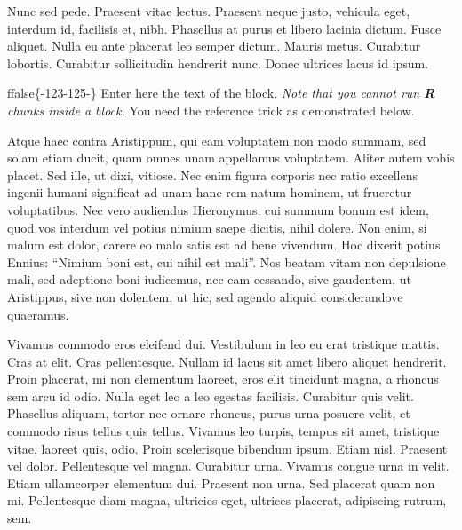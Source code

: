 \documentclass[twoside]{extreport}
\begin{document}
Nunc sed pede. Praesent vitae lectus. Praesent neque justo, vehicula
eget, interdum id, facilisis et, nibh. Phasellus at purus et libero
lacinia dictum. Fusce aliquet. Nulla eu ante placerat leo semper dictum.
Mauris metus. Curabitur lobortis. Curabitur sollicitudin hendrerit nunc.
Donec ultrices lacus id ipsum.














\begin{exampleblock}{}
ffalse\{-123-125-\}\fi{} Enter here the text of the block. \emph{Note
that you cannot run \textbf{R} chunks inside a block.} You need the
reference trick as demonstrated below.

Atque haec contra Aristippum, qui eam voluptatem non
modo summam, sed solam etiam ducit, quam omnes unam appellamus
voluptatem. Aliter autem vobis placet. Sed ille, ut dixi, vitiose. Nec
enim figura corporis nec ratio excellens ingenii humani significat ad
unam hanc rem natum hominem, ut frueretur voluptatibus. Nec vero
audiendus Hieronymus, cui summum bonum est idem, quod vos interdum vel
potius nimium saepe dicitis, nihil dolere. Non enim, si malum est dolor,
carere eo malo satis est ad bene vivendum. Hoc dixerit potius Ennius:
``Nimium boni est, cui nihil est mali''. Nos beatam vitam non depulsione
mali, sed adeptione boni iudicemus, nec eam cessando, sive gaudentem, ut
Aristippus, sive non dolentem, ut hic, sed agendo aliquid considerandove
quaeramus.
\end{exampleblock}

Vivamus commodo eros eleifend dui. Vestibulum in leo eu erat tristique
mattis. Cras at elit. Cras pellentesque. Nullam id lacus sit amet libero
aliquet hendrerit. Proin placerat, mi non elementum laoreet, eros elit
tincidunt magna, a rhoncus sem arcu id odio. Nulla eget leo a leo
egestas facilisis. Curabitur quis velit. Phasellus aliquam, tortor nec
ornare rhoncus, purus urna posuere velit, et commodo risus tellus quis
tellus. Vivamus leo turpis, tempus sit amet, tristique vitae, laoreet
quis, odio. Proin scelerisque bibendum ipsum. Etiam nisl. Praesent vel
dolor. Pellentesque vel magna. Curabitur urna. Vivamus congue urna in
velit. Etiam ullamcorper elementum dui. Praesent non urna. Sed placerat
quam non mi. Pellentesque diam magna, ultricies eget, ultrices placerat,
adipiscing rutrum, sem.
\end{document}
